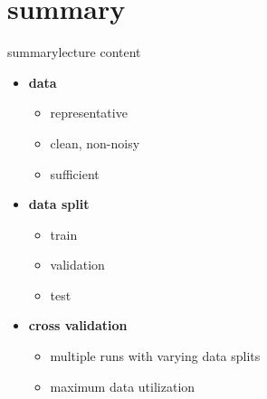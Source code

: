     \section{summary}
        \begin{frame}{summary}{lecture content}
            \begin{itemize}
                \item   \textbf{data}
                    \begin{itemize}
                        \item   {representative}
                        \item   {clean}, non-noisy
                        \item   {sufficient}
                    \end{itemize}
                \bigskip
                \item   \textbf{data split}
                    \begin{itemize}
                        \item   {train}
                        \item   {validation}
                        \item   {test}
                    \end{itemize}
                \bigskip
                \item   \textbf{cross validation}
                    \begin{itemize}
                        \item   multiple runs with varying data splits
                        \item   maximum data utilization
                    \end{itemize}
            \end{itemize}
        \end{frame}

